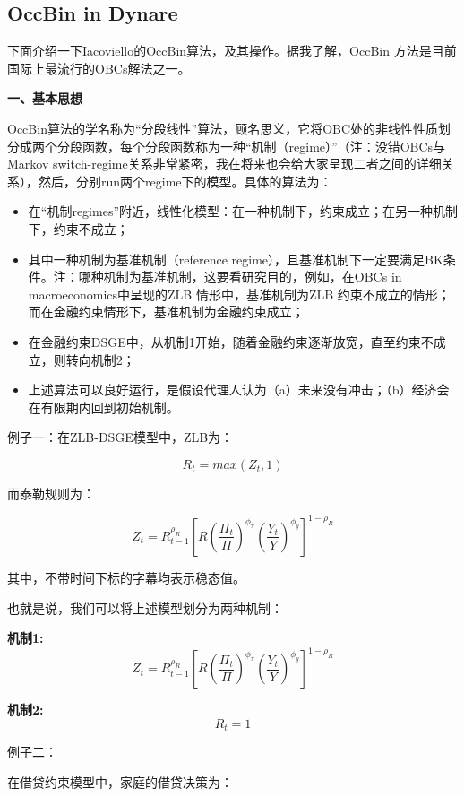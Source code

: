 \documentclass[cn,10pt,math=newtx,citestyle=gb7714-2015,bibstyle=gb7714-2015]{elegantbook}
\begin{document}
\subsection{OccBin in Dynare}

下面介绍一下Iacoviello的OccBin算法，及其操作。据我了解，OccBin 方法是目前国际上最流行的OBCs解法之一。

\textbf{一、基本思想}

OccBin算法的学名称为“分段线性”算法，顾名思义，它将OBC处的非线性性质划分成两个分段函数，每个分段函数称为一种“机制（regime）”（注：没错OBCs与Markov switch-regime关系非常紧密，我在将来也会给大家呈现二者之间的详细关系），然后，分别run两个regime下的模型。具体的算法为：

\begin{itemize}
	
	\item 在“机制regimes”附近，线性化模型：在一种机制下，约束成立；在另一种机制下，约束不成立；
	
	\item 其中一种机制为基准机制（reference regime），且基准机制下一定要满足BK条件。注：哪种机制为基准机制，这要看研究目的，例如，在OBCs in macroeconomics中呈现的ZLB 情形中，基准机制为ZLB 约束不成立的情形；而在金融约束情形下，基准机制为金融约束成立；
	
	\item 在金融约束DSGE中，从机制1开始，随着金融约束逐渐放宽，直至约束不成立，则转向机制2；
	
	\item 上述算法可以良好运行，是假设代理人认为（a）未来没有冲击；（b）经济会在有限期内回到初始机制。
\end{itemize}

例子一：在ZLB-DSGE模型中，ZLB为：

$$R_t=max(Z_t,1)$$

而泰勒规则为：

$$Z_t=R_{t-1}^{\rho_R}\left[R\left(\frac{\Pi_t}{\Pi}\right)^{\phi_{\pi}}\left(\frac{Y_t}{Y}\right)^{\phi_y}\right]^{1-\rho_R}$$

其中，不带时间下标的字幕均表示稳态值。

也就是说，我们可以将上述模型划分为两种机制：

\textbf{机制1:}
$$Z_t=R_{t-1}^{\rho_R}\left[R\left(\frac{\Pi_t}{\Pi}\right)^{\phi_{\pi}}\left(\frac{Y_t}{Y}\right)^{\phi_y}\right]^{1-\rho_R}$$

\textbf{机制2:}
$$R_t=1$$

例子二：

在借贷约束模型中，家庭的借贷决策为：
\end{document}
